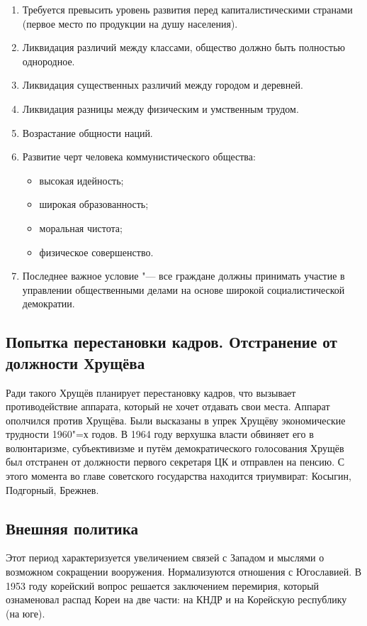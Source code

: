 \begin{enumerate}
    \item Требуется превысить уровень развития перед капиталистическими странами (первое место по продукции на душу населения).
    \item Ликвидация различий между классами, общество должно быть полностью однородное.
    \item Ликвидация существенных различий между городом и деревней.
    \item Ликвидация разницы между физическим и умственным трудом.
    \item Возрастание общности наций.
    \item Развитие черт человека коммунистического общества:
        \begin{itemize}
            \item высокая идейность;
            \item широкая образованность;
            \item моральная чистота;
            \item физическое совершенство.
        \end{itemize}
    \item Последнее важное условие "--- все граждане должны принимать участие в управлении общественными делами на основе широкой социалистической демократии.

\end{enumerate}

\subsection{Попытка перестановки кадров. Отстранение от должности Хрущёва}

Ради такого Хрущёв планирует перестановку кадров, что вызывает противодействие аппарата, который не хочет отдавать свои места. Аппарат ополчился против Хрущёва. Были высказаны в упрек Хрущёву экономические трудности 1960"=х годов. В 1964 году верхушка власти обвиняет его в волюнтаризме, субъективизме и путём демократического голосования Хрущёв был отстранен от должности первого секретаря ЦК и отправлен на пенсию. С этого момента во главе советского государства находится триумвират: Косыгин, Подгорный, Брежнев.

\subsection{Внешняя политика}

Этот период характеризуется увеличением связей с Западом и мыслями о возможном сокращении вооружения. Нормализуются отношения с Югославией. В 1953 году корейский вопрос решается заключением перемирия, который ознаменовал распад Кореи на две части: на КНДР и на Корейскую республику (на юге).

